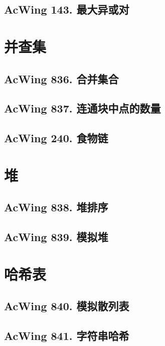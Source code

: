 \subsection{AcWing 143. 最大异或对}

\section{并查集}
\subsection{AcWing 836. 合并集合}
\subsection{AcWing 837. 连通块中点的数量}
\subsection{AcWing 240. 食物链}

\section{堆}
\subsection{AcWing 838. 堆排序}
\subsection{AcWing 839. 模拟堆}

\section{哈希表}
\subsection{AcWing 840. 模拟散列表}
\subsection{AcWing 841. 字符串哈希}
